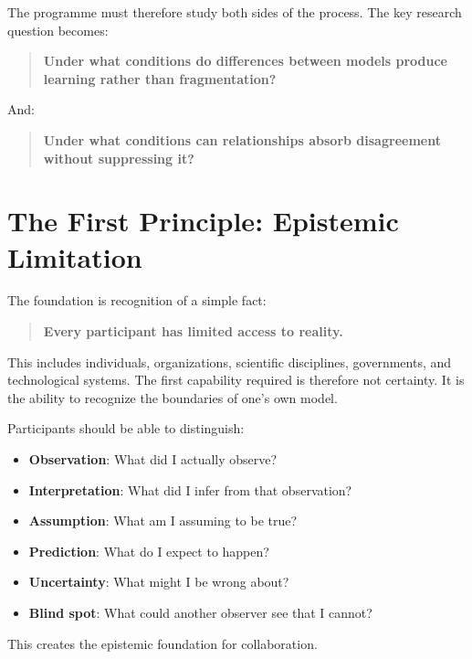 \documentclass{article}
\begin{document}
The programme must therefore study both sides of the process. The key research question becomes:
\begin{quote}
    \textbf{Under what conditions do differences between models produce learning rather than fragmentation?}
\end{quote}
And:
\begin{quote}
    \textbf{Under what conditions can relationships absorb disagreement without suppressing it?}
\end{quote}

\section{The First Principle: Epistemic Limitation}
The foundation is recognition of a simple fact:
\begin{quote}
    \textbf{Every participant has limited access to reality.}
\end{quote}

This includes individuals, organizations, scientific disciplines, governments, and technological systems. The first capability required is therefore not certainty. It is the ability to recognize the boundaries of one's own model.

Participants should be able to distinguish:
\begin{itemize}
    \item \textbf{Observation}: What did I actually observe?
    \item \textbf{Interpretation}: What did I infer from that observation?
    \item \textbf{Assumption}: What am I assuming to be true?
    \item \textbf{Prediction}: What do I expect to happen?
    \item \textbf{Uncertainty}: What might I be wrong about?
    \item \textbf{Blind spot}: What could another observer see that I cannot?
\end{itemize}

This creates the epistemic foundation for collaboration.
\end{document}
